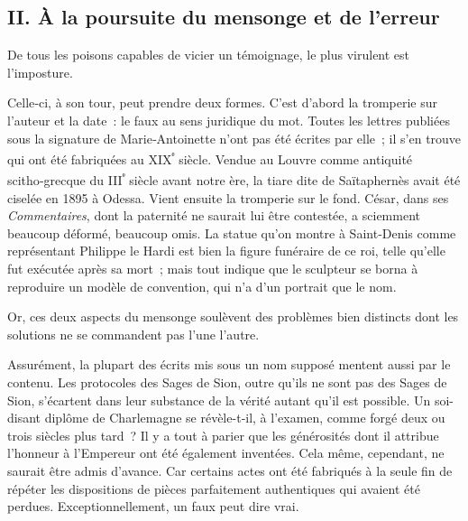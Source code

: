 \documentclass[french,twoside]{book} %
\begin{document}
\subsection[{II. À la poursuite du mensonge et de l’erreur}]{II. À la poursuite du mensonge et de l’erreur}
\noindent De tous les poisons capables de vicier un témoignage, le plus virulent est l’imposture.\par
Celle‑ci, à son tour, peut prendre deux formes. C’est d’abord la trom­perie sur l’auteur et la date : le faux au sens juridique du mot. Toutes les lettres publiées sous la signature de Marie‑Antoinette n’ont pas été écrites par elle ; il s’en trouve qui ont été fabriquées au XIX\textsuperscript{ᵉ} siècle. Vendue au Louvre comme antiquité scitho‑grecque du III\textsuperscript{ᵉ} siècle avant notre ère, la tiare dite de Saïtaphernès avait été ciselée en 1895 à Odessa. Vient ensuite la tromperie sur le fond. César, dans ses \emph{Commentaires}, dont la paternité ne saurait lui être contestée, a sciemment beaucoup déformé, beaucoup omis. La statue qu’on montre à Saint‑Denis comme représentant Philippe le Hardi est bien la figure funéraire de ce roi, telle qu’elle fut exécutée après sa mort ; mais tout indique que le sculpteur  
\label{p42} se borna à reproduire un modèle de convention, qui n’a d’un portrait que le nom.\par
Or, ces deux aspects du mensonge soulèvent des problèmes bien dis­tincts dont les solutions ne se commandent pas l’une l’autre.\par
Assurément, la plupart des écrits mis sous un nom supposé mentent aussi par le contenu. Les protocoles des Sages de Sion, outre qu’ils ne sont pas des Sages de Sion, s’écartent dans leur substance de la vérité autant qu’il est possible. Un soi-disant diplôme de Charlemagne se révèle-­t‑il, à l’examen, comme forgé deux ou trois siècles plus tard ? Il y a tout à parier que les générosités dont il attribue l’honneur à l’Empereur ont été également inventées. Cela même, cependant, ne saurait être admis d’avance. Car certains actes ont été fabriqués à la seule fin de répéter les dispositions de pièces parfaitement authentiques qui avaient été perdues. Exceptionnellement, un faux peut dire vrai.\par
\end{document}

